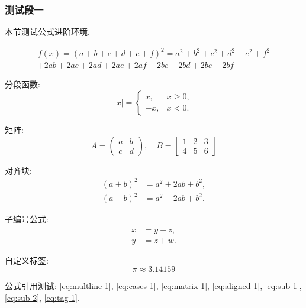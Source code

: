 \subsubsection{测试段一}

本节测试公式进阶环境.

\begin{multline}
    f(x) = (a+b+c+d+e+f)^2 = a^2 + b^2 + c^2 + d^2 + e^2 + f^2 \\
    + 2ab + 2ac + 2ad + 2ae + 2af + 2bc + 2bd + 2be + 2bf
    \label{eq:multline-1}
\end{multline}

分段函数:
\begin{equation}
    |x| =
    \begin{cases}
        x, & x \geq 0, \\
        -x, & x < 0.
    \end{cases}
    \label{eq:cases-1}
\end{equation}

矩阵:
\begin{equation}
    A = \begin{pmatrix}
        a & b \\
        c & d
    \end{pmatrix},
    \quad
    B = \begin{bmatrix}
        1 & 2 & 3 \\
        4 & 5 & 6
    \end{bmatrix}
    \label{eq:matrix-1}
\end{equation}

对齐块:
\begin{equation}
    \begin{aligned}
        (a+b)^2 &= a^2 + 2ab + b^2, \\
        (a-b)^2 &= a^2 - 2ab + b^2.
    \end{aligned}
    \label{eq:aligned-1}
\end{equation}

子编号公式:
\begin{subequations}
    \begin{align}
        x &= y + z, \label{eq:sub-1} \\
        y &= z + w. \label{eq:sub-2}
    \end{align}
\end{subequations}

自定义标签:
\begin{equation}
    \pi \approx 3.14159 \tag{$\ast$}
    \label{eq:tag-1}
\end{equation}

公式引用测试: \eqref{eq:multline-1}, \eqref{eq:cases-1}, \eqref{eq:matrix-1}, \eqref{eq:aligned-1}, \eqref{eq:sub-1}, \eqref{eq:sub-2}, \eqref{eq:tag-1}.
